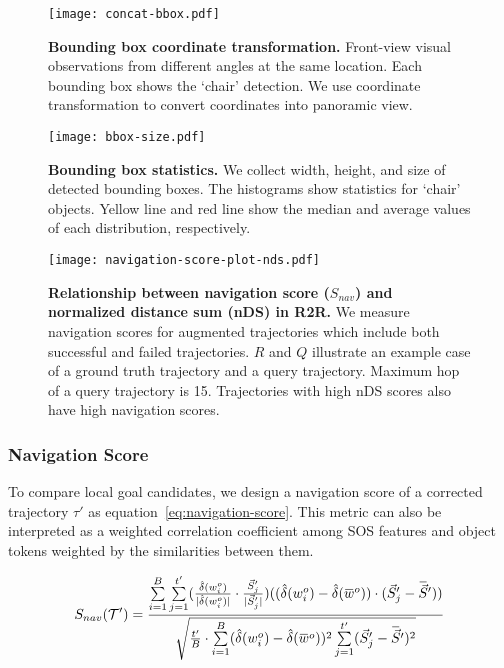 \documentclass[10pt,twocolumn,letterpaper]{article}
\newcommand{\overbar}[1]{\mkern 1.5mu\overline{\mkern-1.5mu#1\mkern-1.5mu}\mkern 1.5mu}
\begin{document}
\begin{figure}[t!]{\centering\texttt{[image: concat-bbox.pdf]}}\centering
\caption{{\textbf{Bounding box coordinate transformation.} Front-view visual observations from different angles at the same location. Each bounding box shows the `chair' detection. We use coordinate transformation to convert coordinates into panoramic view.
}}\label{fig:bbox-coordinate-transformation}
\end{figure}
\begin{figure}[t!]{\centering\texttt{[image: bbox-size.pdf]}}\centering
\caption{{\textbf{Bounding box statistics.} We collect width, height, and size of detected bounding boxes. The histograms show statistics for `chair' objects. Yellow line and red line show the median and average values of each distribution, respectively.
}}\label{fig:bbox-size} \vspace{-0.2cm}
\end{figure}
\begin{figure}[t!]{\centering\texttt{[image: navigation-score-plot-nds.pdf]}}\centering
\caption{{\textbf{Relationship between navigation score ($S_{nav}$) and normalized distance sum (nDS) in R2R.} We measure navigation scores for augmented trajectories which include both successful and failed trajectories. $R$ and $Q$ illustrate an example case of a ground truth trajectory and a query trajectory. Maximum hop of a query trajectory is 15. Trajectories with high nDS scores also have high navigation scores.
}}\label{fig:navigation-score-plot} 
\end{figure}

\vspace{-0.4cm}
\subsubsection{Navigation Score}
To compare local goal candidates, we design a navigation score of a corrected trajectory $\tau'$ as equation~\ref{eq:navigation-score}. This metric can also be interpreted as a weighted correlation coefficient among SOS features and object tokens weighted by the similarities between them.

{\footnotesize
\begin{align}\label{eq:navigation-score}
    \begin{split}
        S_{nav}(\mathcal{T}') = {{\sum\limits_{i=1}^{B}\sum\limits_{j=1}^{t'} ({\hat\delta(w^o_i)\over{|\hat\delta(w^o_i)|}}\cdot {\vec{S}'_j\over{|\vec{S}'_j|}})((\hat\delta(w^o_i)-\hat\delta(\overbar{w}^o))\cdot(\vec{S}'_j-\overbar{\vec{S}}'))}\over{\sqrt{{{t'}\over B}\cdot\sum\limits_{i=1}^{B} (\hat\delta(w^o_i)-\hat\delta(\overbar{w}^o))^2\sum\limits_{j=1}^{t'} (\vec{S}'_j-\overbar{\vec{S}}')^2}}}
    \end{split}
\end{align}
}
\end{document}
